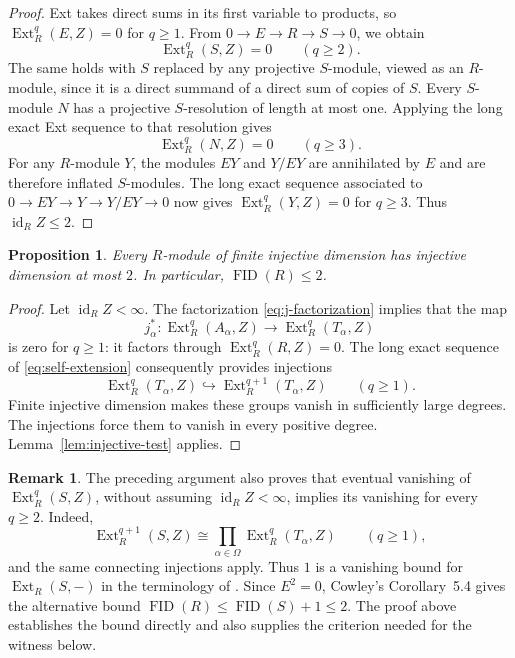 \documentclass[11pt]{amsart}
\newtheorem{proposition}[theorem]{Proposition}
\theoremstyle{definition}
\newtheorem{remark}[theorem]{Remark}
\DeclareMathOperator{\FID}{FID}
\DeclareMathOperator{\id}{id}
\DeclareMathOperator{\Ext}{Ext}
\newcommand{\into}{\hookrightarrow}
\numberwithin{equation}{section}
\begin{document}
\begin{proof}
Ext takes direct sums in its first variable to products, so
$\Ext_R^q(E,Z)=0$ for $q\geq1$. From $0\to E\to R\to S\to0$,
we obtain
\begin{equation}\label{eq:S-high-ext}
 \Ext_R^q(S,Z)=0\qquad(q\geq2).
\end{equation}
The same holds with $S$ replaced by any projective $S$-module,
viewed as an $R$-module, since it is a direct summand of a direct sum
of copies of $S$. Every $S$-module $N$ has a projective
$S$-resolution of length at most one. Applying the long exact Ext
sequence to that resolution gives
\[
 \Ext_R^q(N,Z)=0\qquad(q\geq3).
\]
For any $R$-module $Y$, the modules $EY$ and $Y/EY$ are annihilated
by $E$ and are therefore inflated $S$-modules. The long exact
sequence associated to $0\to EY\to Y\to Y/EY\to0$ now gives
$\Ext_R^q(Y,Z)=0$ for $q\geq3$. Thus $\id_R Z\leq2$.
\end{proof}

\begin{proposition}\label{prop:fid-upper}
Every $R$-module of finite injective dimension has injective
dimension at most $2$. In particular, $\FID(R)\leq2$.
\end{proposition}

\begin{proof}
Let $\id_R Z<\infty$. The factorization
\eqref{eq:j-factorization} implies that the map
\[
 j_\alpha^*:\Ext_R^q(A_\alpha,Z)\longrightarrow
                      \Ext_R^q(T_\alpha,Z)
\]
is zero for $q\geq1$: it factors through $\Ext_R^q(R,Z)=0$.
The long exact sequence of \eqref{eq:self-extension} consequently
provides injections
\[
 \Ext_R^q(T_\alpha,Z)\into\Ext_R^{q+1}(T_\alpha,Z)
                 \qquad(q\geq1).
\]
Finite injective dimension makes these groups vanish in sufficiently
large degrees. The injections force them to vanish in every positive
degree. Lemma~\ref{lem:injective-test} applies.
\end{proof}

\begin{remark}\label{rem:cowley}
The preceding argument also proves that eventual vanishing of
$\Ext_R^q(S,Z)$, without assuming $\id_R Z<\infty$, implies its
vanishing for every $q\geq2$. Indeed,
\[
 \Ext_R^{q+1}(S,Z)\cong\prod_{\alpha\in\Omega}
                    \Ext_R^q(T_\alpha,Z)\qquad(q\geq1),
\]
and the same connecting injections apply. Thus $1$ is a vanishing
bound for $\Ext_R(S,-)$ in the terminology of
\cite[p.~362]{Cowley1997}. Since $E^2=0$, Cowley's
Corollary~5.4 \cite[p.~370]{Cowley1997} gives the alternative bound
$\FID(R)\leq\FID(S)+1\leq2$. The proof above establishes the bound
directly and also supplies the criterion needed for the witness below.
\end{remark}
\end{document}
